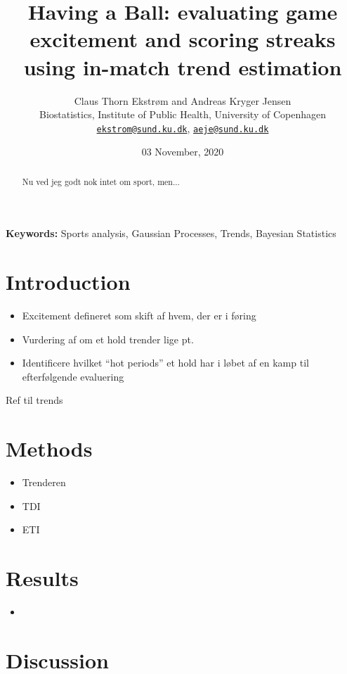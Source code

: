 \documentclass[
  11pt,
]{article}
\title{Having a Ball: evaluating game excitement and scoring streaks using
in-match trend estimation}
\author{Claus Thorn Ekstrøm and Andreas Kryger Jensen\\
Biostatistics, Institute of Public Health, University of Copenhagen\\
\href{mailto:ekstrom@sund.ku.dk}{\nolinkurl{ekstrom@sund.ku.dk}},
\href{mailto:aeje@sund.ku.dk}{\nolinkurl{aeje@sund.ku.dk}}}
\date{03 November, 2020}
\theoremstyle{nonumberplain}
\begin{document}
\maketitle

\begin{abstract}
Nu ved jeg godt nok intet om sport, men...
\end{abstract}

\begin{center}
\textbf{Keywords:} Sports analysis, Gaussian Processes, Trends, Bayesian Statistics
\end{center}

\hypertarget{introduction}{%
\section{Introduction}\label{introduction}}

\begin{itemize}
\item Excitement defineret som skift af hvem, der er i føring
\item Vurdering af om et hold trender lige pt.
\item Identificere hvilket ``hot periods'' et hold har i løbet af en kamp til efterfølgende evaluering
\end{itemize}

Ref til trends

\hypertarget{sec:method}{%
\section{Methods}\label{sec:method}}

\begin{itemize}
\item Trenderen
\item TDI
\item ETI
\end{itemize}


\hypertarget{sec:application}{%
\section{Results}\label{sec:application}}

\begin{itemize}
\item 
\end{itemize}


\hypertarget{sec:discussion}{%
\section{Discussion}\label{sec:discussion}}
\end{document}
